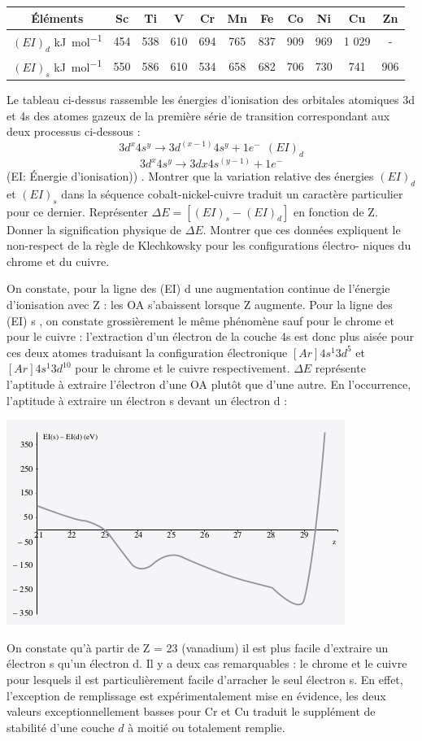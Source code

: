 \begin{Exercise}[title=Énergie d'ionisation]
\begin{center}
		\begin{tabular}{|c|c|c|c|c|c|c|c|c|c|c|}
			\hline
			Éléments & Sc &Ti &V &Cr &Mn &Fe &Co &Ni &Cu &Zn \\
			\hline
			$(EI)_d$ \si{\kJ\per\mol}& 454 &538 &610 &694 &765 &837 &909 &969 &1 029 & - \\
			\hline
			$(EI)_s$ \si{\kJ\per\mol}& 550 &586 &610 &534 &658 &682 &706 &730 &741 &906\\
			\hline
	\end{tabular}
\end{center}
Le tableau ci-dessus rassemble les énergies d’ionisation des orbitales atomiques 3d et 4s des atomes gazeux de la première série de transition correspondant aux deux processus
 ci-dessous :
\[3d^x4s^y \to 3d^(x-1) 4s^y + 1e^- ~~ (EI)_d\]
\[3d^x 4s^y \to 3d x 4s^(y-1) + 1e^-\]
(EI: Énergie d'ionisation))
\Question. Montrer que la variation relative des énergies $(EI)_d$ et $(EI)_s$ dans la séquence cobalt-nickel-cuivre traduit un caractère particulier pour ce dernier.
\Question Représenter $\Delta E = [(EI)_s -(EI)_d ]$ en fonction de Z. Donner la signification physique de $\Delta E$.
\Question Montrer que ces données expliquent le non-respect de la règle de Klechkowsky pour les configurations électro-
niques du chrome et du cuivre.

\end{Exercise}
\begin{Answer}
	\Question On constate, pour la ligne des (EI) d une augmentation continue de l’énergie d’ionisation avec Z : les OA s’abaissent lorsque Z augmente. Pour la ligne des (EI) s , on constate grossièrement le même phénomène sauf pour le chrome et pour le cuivre : l’extraction d’un électron de la couche 4s est donc plus aisée pour ces deux atomes traduisant la configuration électronique $[Ar]4s^1 3d^5$ et $[Ar]4s^1 3d^10$ pour le chrome et le cuivre respectivement.
	\Question $\Delta E$ représente l’aptitude à extraire l’électron d’une OA plutôt que d’une autre. En l’occurrence, l’aptitude à extraire un	électron s devant un électron d :
	\begin{center}
		\includegraphics[width=0.4\linewidth]{../fig/Delta_EZ.png}
	\end{center}
	On constate qu’à partir de Z = 23 (vanadium) il est plus facile
	d’extraire un électron s qu’un électron d. Il y a deux cas remarquables : le chrome et le cuivre pour lesquels il est particulièrement facile d’arracher le seul électron s.
	\Question En effet, l’exception de remplissage est expérimentalement mise en évidence, les deux valeurs exceptionnellement basses 	pour Cr et Cu traduit le supplément de stabilité d’une couche $d$ à moitié ou totalement remplie.

\end{Answer}
